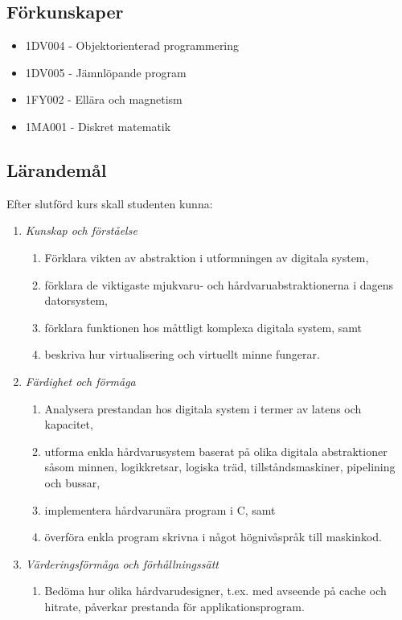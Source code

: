 \subsection*{Förkunskaper}

\begin{itemize}
\tightlist
\item
  1DV004 - Objektorienterad programmering
\item
  1DV005 - Jämnlöpande program
\item
  1FY002 - Ellära och magnetism
\item
  1MA001 - Diskret matematik
\end{itemize}

\subsection*{Lärandemål}

Efter slutförd kurs skall studenten kunna:

\begin{enumerate}
\def\labelenumi{\Alph{enumi}.}
\tightlist
\item
  \emph{Kunskap och förståelse}

  \begin{enumerate}
  \def\labelenumii{\Alph{enumi}.\arabic{enumii}.}
  \tightlist
  \item
    Förklara vikten av abstraktion i utformningen av digitala system,
  \item
    förklara de viktigaste mjukvaru- och hårdvaruabstraktionerna i
    dagens datorsystem,
  \item
    förklara funktionen hos måttligt komplexa digitala system, samt
  \item
    beskriva hur virtualisering och virtuellt minne fungerar.
  \end{enumerate}
\item
  \emph{Färdighet och förmåga}

  \begin{enumerate}
  \def\labelenumii{\Alph{enumi}.\arabic{enumii}.}
  \tightlist
  \item
    Analysera prestandan hos digitala system i termer av latens och
    kapacitet,
  \item
    utforma enkla hårdvarusystem baserat på olika digitala abstraktioner
    såsom minnen, logikkretsar, logiska träd, tillståndsmaskiner,
    pipelining och bussar,
  \item
    implementera hårdvarunära program i C, samt
  \item
    överföra enkla program skrivna i något högnivåspråk till maskinkod.
  \end{enumerate}
\item
  \emph{Värderingsförmåga och förhållningssätt}

  \begin{enumerate}
  \def\labelenumii{\Alph{enumi}.\arabic{enumii}.}
  \tightlist
  \item
    Bedöma hur olika hårdvarudesigner, t.ex. med avseende på cache och
    hitrate, påverkar prestanda för applikationsprogram.
  \end{enumerate}
\end{enumerate}


